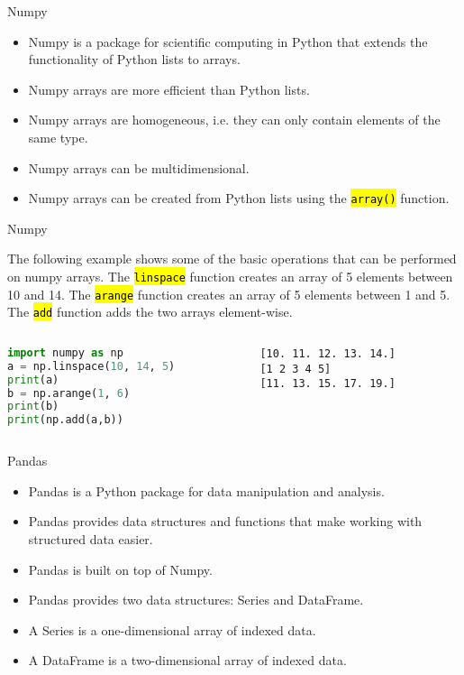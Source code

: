 \documentclass[
    aspectratio=169, 
    usepdftitle=false, 
    xcolor={dvipsnames},
    hyperref={
        colorlinks,
        linkcolor=black,
        urlcolor=blue}
    ]{beamer}
\let\OldTexttt\texttt
\renewcommand{\texttt}[1]{\OldTexttt{\hl{#1}}}%
\begin{document}
\begin{frame}[fragile]{Numpy}
    \begin{itemize}
        \item Numpy is a package for scientific computing in Python that extends the functionality of Python lists to arrays.
        \item Numpy arrays are more efficient than Python lists.
        \item Numpy arrays are homogeneous, i.e. they can only contain elements of the same type.
        \item Numpy arrays can be multidimensional.
        \item Numpy arrays can be created from Python lists using the \texttt{array()} function.
    \end{itemize}
\end{frame}
\begin{frame}[fragile]{Numpy}

    The following example shows some of the basic operations that can be performed on numpy arrays. The \texttt{linspace} function creates an array of 5 elements between 10 and 14. The \texttt{arange} function creates an array of 5 elements between 1 and 5. The \texttt{add} function adds the two arrays element-wise.

    \begin{columns}
        \begin{column}{0.5\textwidth}
\begin{lstlisting}[language=Python]
import numpy as np
a = np.linspace(10, 14, 5)
print(a)    
b = np.arange(1, 6)
print(b)
print(np.add(a,b))
\end{lstlisting}
\end{column}
\begin{column}{0.4\textwidth}
\begin{lstlisting}[style=output]
[10. 11. 12. 13. 14.]
[1 2 3 4 5]
[11. 13. 15. 17. 19.]
\end{lstlisting}
\end{column}
\end{columns}
\end{frame}

\begin{frame}{Pandas}
    \begin{itemize}
        \item Pandas is a Python package for data manipulation and analysis.
        \item Pandas provides data structures and functions that make working with structured data easier.
        \item Pandas is built on top of Numpy.
        \item Pandas provides two data structures: Series and DataFrame.
        \item A Series is a one-dimensional array of indexed data.
        \item A DataFrame is a two-dimensional array of indexed data.
    \end{itemize}
\end{frame}
\end{document}
